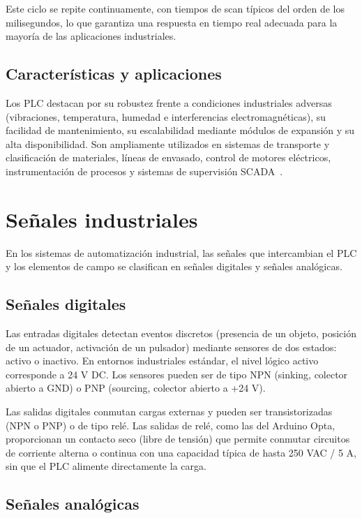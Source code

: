 \documentclass[12pt,a4paper,oneside]{report}
\begin{document}
Este ciclo se repite continuamente, con tiempos de scan típicos del orden de los milisegundos, lo que garantiza una respuesta en tiempo real adecuada para la mayoría de las aplicaciones industriales.

\subsection{Características y aplicaciones}

Los PLC destacan por su robustez frente a condiciones industriales adversas (vibraciones, temperatura, humedad e interferencias electromagnéticas), su facilidad de mantenimiento, su escalabilidad mediante módulos de expansión y su alta disponibilidad. Son ampliamente utilizados en sistemas de transporte y clasificación de materiales, líneas de envasado, control de motores eléctricos, instrumentación de procesos y sistemas de supervisión SCADA~\cite{ref3}.

\section{Señales industriales}

En los sistemas de automatización industrial, las señales que intercambian el PLC y los elementos de campo se clasifican en señales digitales y señales analógicas.

\subsection{Señales digitales}

Las entradas digitales detectan eventos discretos (presencia de un objeto, posición de un actuador, activación de un pulsador) mediante sensores de dos estados: activo o inactivo. En entornos industriales estándar, el nivel lógico activo corresponde a 24 V DC. Los sensores pueden ser de tipo NPN (sinking, colector abierto a GND) o PNP (sourcing, colector abierto a +24 V).

Las salidas digitales conmutan cargas externas y pueden ser transistorizadas (NPN o PNP) o de tipo relé. Las salidas de relé, como las del Arduino Opta, proporcionan un contacto seco (libre de tensión) que permite conmutar circuitos de corriente alterna o continua con una capacidad típica de hasta 250 VAC / 5 A, sin que el PLC alimente directamente la carga.

\subsection{Señales analógicas}
\end{document}
